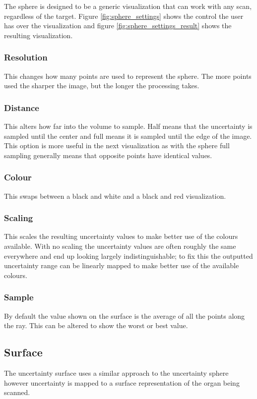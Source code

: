 The sphere is designed to be a generic visualization that can work with any scan, regardless of the target. Figure \ref{fig:sphere_settings} shows the control the user has over the visualization and figure \ref{fig:sphere_settings_result} shows the resulting visualization.

\subsubsection{Resolution}
This changes how many points are used to represent the sphere. The more points used the sharper the image, but the longer the processing takes.

\subsubsection{Distance}
This alters how far into the volume to sample. Half means that the uncertainty is sampled until the center and full means it is sampled until the edge of the image. This option is more useful in the next visualization as with the sphere full sampling generally means that opposite points have identical values.

\subsubsection{Colour}
This swaps between a black and white and a black and red visualization.

\subsubsection{Scaling}
This scales the resulting uncertainty values to make better use of the colours available. With no scaling the uncertainty values are often roughly the same everywhere and end up looking largely indistinguishable; to fix this the outputted uncertainty range can be linearly mapped to make better use of the available colours.

\subsubsection{Sample}
By default the value shown on the surface is the average of all the points along the ray. This can be altered to show the worst or best value.

\clearpage
\subsection{Surface}\label{implementation:surface}
The uncertainty surface uses a similar approach to the uncertainty sphere however uncertainty is mapped to a surface representation of the organ being scanned.

